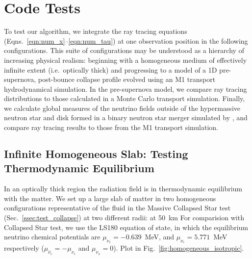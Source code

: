 \documentclass[aps,floatfix,prd,superscriptaddress,twocolumn]{revtex4-1}
\newcommand{\todo}[1]{\marginpar{\tiny{\textcolor{red}{#1}}}}
\begin{document}
\section{Code Tests}
\label{sec:tests}

To test our algorithm, we integrate the ray tracing equations
(Eqns.~\ref{eqn:num_x}--\ref{eqn:num_tau}) at one observation position
in the following configurations. This suite of configurations
may be understood as a hierarchy of increasing physical realism:
beginning with a homogeneous medium of effectively
infinite extent (i.e.\ optically thick) and progressing to a model of a
1D pre-supernova, post-bounce collapse profile
evolved using an M1 transport hydrodynamical simulation.
In the pre-supernova model, we compare ray tracing distributions
to those calculated in a Monte Carlo transport simulation.
Finally, we calculate global measures of the neutrino fields outside of the
hypermassive neutron star and disk formed in a binary neutron star
merger simulated by \cite{fouc2016-m1_nsns, fouc2016-m1_evolve_n},
and compare ray tracing results to those from the M1 transport simulation.

\subsection{Infinite Homogeneous Slab:
  Testing Thermodynamic Equilibrium}
\label{ssec:test_equilibrium}
In an optically thick region the radiation field is in thermodynamic equilibrium
with the matter.
We set up a large slab of matter in two homogeneous configurations
representative of the fluid in the Massive Collapsed Star test
(Sec.~\ref{ssec:test_collapse}) at two different radii:
at 50~km
For comparision with Collapsed Star test, we use the LS180 equation of state,
in which the equilibrium
neutrino chemical potentials are
$\mu_{\nu_e}=-0.639$~MeV, and 
$\mu_{\nu_e}=5.771$~MeV respectively
($\mu_{\bar{\nu}_e}=-\mu_{\nu_e}$ and $\mu_{\nu_x}=0$).
Plot in Fig.~\ref{fig:homogeneous_isotropic}.
\todo{run test at this thermodynamic point}
\end{document}

